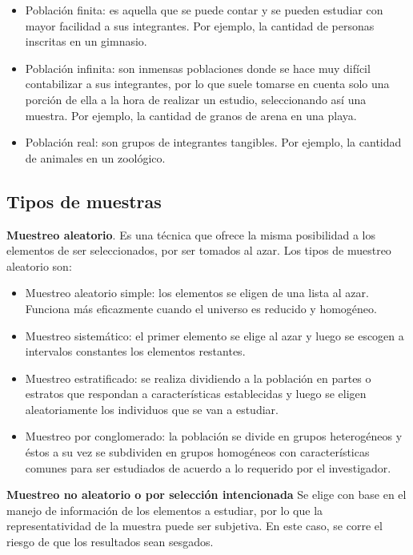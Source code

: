 \begin{itemize} 
    \item Población finita: es aquella que se puede contar y se pueden
estudiar con mayor facilidad a sus integrantes. Por ejemplo, la cantidad de
personas inscritas en un gimnasio. 
    \item Población infinita: son inmensas poblaciones
donde se hace muy difícil contabilizar a sus integrantes, por lo que suele
tomarse en cuenta solo una porción de ella a la hora de realizar un estudio,
seleccionando así una muestra. Por ejemplo, la cantidad de granos de arena en
una playa. 
    \item Población real: son grupos de integrantes tangibles. Por ejemplo, la
cantidad de animales en un zoológico.
\end{itemize}

\subsection{Tipos de muestras}

\textbf{Muestreo aleatorio}. Es una técnica que ofrece la misma posibilidad a los
elementos de ser seleccionados, por ser tomados al azar. Los tipos de muestreo
aleatorio son:

\begin{itemize}

    \item Muestreo aleatorio simple: los elementos se eligen de una lista al azar.
Funciona más eficazmente cuando el universo es reducido y homogéneo. 

\item Muestreo sistemático: el primer elemento se elige al azar y luego se
escogen a intervalos constantes los elementos restantes. 

\item Muestreo estratificado: se realiza dividiendo a la población en partes o
estratos que respondan a características establecidas y luego se eligen
aleatoriamente los individuos que se van a estudiar. 

\item Muestreo por conglomerado: la población se divide en grupos heterogéneos y
éstos a su vez se subdividen en grupos homogéneos con características comunes
para ser estudiados de acuerdo a lo requerido por el investigador.
\end{itemize}

\textbf{Muestreo no aleatorio o por selección intencionada} Se elige con
base en el manejo de información de los elementos a estudiar, por lo que la
representatividad de la muestra puede ser subjetiva. En este caso, se corre el
riesgo de que los resultados sean sesgados.


